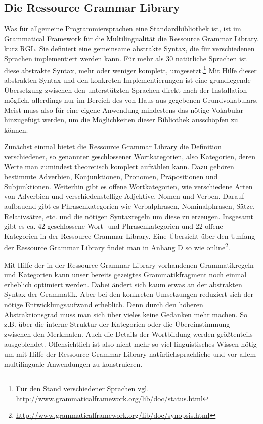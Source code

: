 \subsection{Die Ressource Grammar Library}
\label{subsec:rgl}
Was für allgemeine Programmiersprachen eine Standardbibliothek ist, ist im Grammatical Framework für die Multilingualität die Ressource Grammar Library, kurz RGL. Sie definiert eine gemeinsame abstrakte Syntax, die für verschiedenen Sprachen implementiert werden kann. Für mehr als 30 natürliche Sprachen ist diese abstrakte Syntax, mehr oder weniger komplett, umgesetzt.\footnote{Für den Stand verschiedener Sprachen vgl. \url{http://www.grammaticalframework.org/lib/doc/status.html}} Mit Hilfe dieser abstrakten Syntax und den konkreten Implementierungen ist eine grundlegende Übersetzung zwischen den unterstützten Sprachen direkt nach der Installation möglich, allerdings nur im Bereich des von Haus aus gegebenen Grundvokabulars. Meist muss also für eine eigene Anwendung mindestens das nötige Vokabular hinzugefügt werden, um die Möglichkeiten dieser Bibliothek ausschöpfen zu können. \par
Zunächst einmal bietet die Ressource Grammar Library die Definition verschiedener, so genannter geschlossener Wortkategorien, also Kategorien, deren Werte man zumindest theoretisch komplett aufzählen kann. Dazu gehören bestimmte Adverbien, Konjunktionen, Pronomen, Präpositionen und Subjunktionen. Weiterhin gibt es offene Wortkategorien, wie verschiedene Arten von Adverbien und verschiedenstellige Adjektive, Nomen und Verben. Darauf aufbauend gibt es Phrasenkategorien wie Verbalphrasen, Nominalphrasen, Sätze, Relativsätze, etc. und die nötigen Syntaxregeln um diese zu erzeugen. Insgesamt gibt es ca. 42 geschlossene Wort- und Phrasenkategorien und 22 offene Kategorien in der Ressource Grammar Library. Eine Übersicht über den Umfang der Ressource Grammar Library findet man in \cite{RANTA2011} Anhang D so wie online\footnote{\url{http://www.grammaticalframework.org/lib/doc/synopsis.html}}. \par
Mit Hilfe der in der Ressource Grammar Library vorhandenen Grammatikregeln und Kategorien kann unser bereits gezeigtes Grammatikfragment noch einmal erheblich optimiert werden. Dabei ändert sich kaum etwas an der abstrakten Syntax der Grammatik. Aber bei den konkreten Umsetzungen reduziert sich der nötige Entwicklungsaufwand erheblich. Denn durch den höheren Abstraktionsgrad muss man sich über vieles keine Gedanken mehr machen. So z.B. über die interne Struktur der Kategorien oder die Übereinstimmung zwischen den Merkmalen. Auch die Details der Wortbildung werden größtenteils ausgeblendet. Offensichtlich ist also nicht mehr so viel linguistisches Wissen nötig um mit Hilfe der Ressource Grammar Library natürlichsprachliche und vor allem multilinguale Anwendungen zu konstruieren. \par
